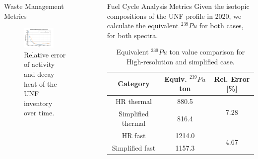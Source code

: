 \documentclass[final]{beamer}
\newlength{\sepwid}
\newlength{\onecolwid}
\newlength{\threecolwid}
\begin{document}
\begin{frame}[t]
\begin{columns}[t,totalwidth=\threecolwid]
\begin{column}{\onecolwid}
\begin{block}{Waste Management Metrics}
\begin{figure}
    \centering
    \includegraphics[width=0.7\textwidth]{../images/ha_err.png}
    \caption{Relative error of activity and decay heat of the
            \gls{UNF} inventory over time.}
    \label{fig:wm_err}
\end{figure}


\end{block}


\end{column} %

\begin{column}{\sepwid}\end{column} %



\begin{column}{\onecolwid} %


\begin{block}{Fuel Cycle Analysis Metrics}
Given the isotopic compositions of the \gls{UNF} profile in 2020,
we calculate the equivalent $^{239}Pu$ for both cases, for
both spectra.

\begin{table}[h]
    \centering
    \begin{tabular}{ccc}
        \hline
        Category & Equiv. $^{239}Pu$ ton & Rel. Error [\%] \\
        \hline
        HR thermal & 880.5 & \multirow{2}{*}{7.28}\\
        Simplified thermal & 816.4\\
        \hline
        HR fast & 1214.0 & \multirow{2}{*}{4.67}\\
        Simplified fast & 1157.3 &\\
        \hline
    \end{tabular}
    \caption{Equivalent $^{239}Pu$ ton value comparison for High-resolution and simplified case.}
    \label{tab:equiv}
\end{table}



\end{block}
\end{column}
\end{columns}
\end{frame}
\end{document}
